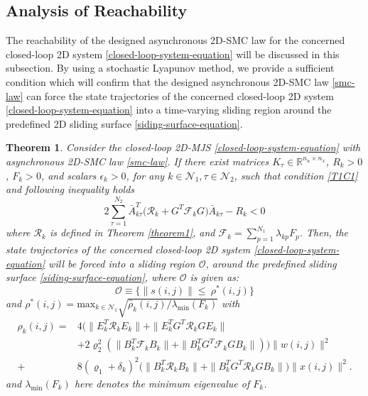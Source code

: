 \documentclass[journal,final,twocolumn]{IEEEtran}
\newtheorem{theorem}{Theorem}
\begin{document}
\subsection{Analysis of Reachability}\label{minimization} 
	 The reachability of the  designed asynchronous 2D-SMC law for the concerned closed-loop 2D system \eqref{closed-loop-system-equation} will be discussed in this subsection. By using a stochastic Lyapunov method, we provide a sufficient condition which will confirm that the designed asynchronous 2D-SMC law \eqref{smc-law} can force the state trajectories of the concerned closed-loop 2D system \eqref{closed-loop-system-equation} into a time-varying sliding region around the predefined 2D sliding surface \eqref{siding-surface-equation}.
	 

\begin{theorem}\label{theorem2}	
	Consider the closed-loop 2D-MJS \eqref{closed-loop-system-equation} with asynchronous 2D-SMC law \eqref{smc-law}. If there exist matrices $K_{\tau }\in\mathbb{R}^{n_u\times n_x}$, $R_{k}>0$, $F_{k}>0$, and  scalars $\epsilon_{k}>0$, for any $k\in\mathcal{N}_{1}, \tau\in\mathcal{N}_{2}$, such that  condition \eqref{T1C1} and  following inequality holds
	\begin{equation} \label{T2C1}
		2\sum_{\tau =1}^{N_{2}} \bar{A}^{T}_{k\tau }\big(\mathcal{R}_{k}+G^{T}\mathcal{F}_{k}G\big)\bar{A}_{k\tau }-R_{k} <0
	\end{equation}
	where $\mathcal{R}_{k}$ is defined in Theorem \ref{theorem1}, and $\mathcal{F}_{k}=\sum_{p=1}^{N_{1}}\lambda_{kp}F_{p}$. Then, the state trajectories of the concerned closed-loop 2D system \eqref{closed-loop-system-equation} will be forced into a sliding region $\mathcal{O}$, around the predefined sliding surface \eqref{siding-surface-equation}, where  $\mathcal{O}$ is given as:
	\begin{equation}\label{smc-region}
		\mathcal{O}\equiv\Big\{\|s(i,j)\|\leq\ \rho^{*}(i,j) \Big\}
	\end{equation} 
	and $\rho^{*}(i,j) = \mathrm{max}_{k\in\mathcal{N}_{1}}\sqrt{\hat{\rho}_{k}(i,j)/
	\lambda_{\mathrm{min}}(F_{k})}$ with
	\begin{equation*}
		 \begin{split}
		 	\hat{\rho}_{k}(i,j)=&4\big(\|E^{T}_{k}\mathcal{R}_{k}E_{k}\|+ \|E^{T}_{k}G^{T}\mathcal{R}_{k}GE_{k}\|\\
		 	&+2\varrho_{2}^{2}(\|B^{T}_{k}\mathcal{F}_{k}B_{k}\|+ \|B^{T}_{k}G^{T}\mathcal{F}_{k}GB_{k}\| )\big)\|w(i,j)\|^{2}\\
		 	+&8(\varrho_{1}+\delta_{k})^{2}\big(\|B^{T}_{k}\mathcal{R}_{k}B_{k}\|+\|B^{T}_{k}G^{T}\mathcal{R}_{k}GB_{k}\|\big)\|x(i,j)\|^{2}.
		 \end{split}
	\end{equation*}
	and $\lambda_{\mathrm{min}}(F_{k})$ here denotes the minimum eigenvalue of $F_{k}$.
\end{theorem} 
\end{document}
